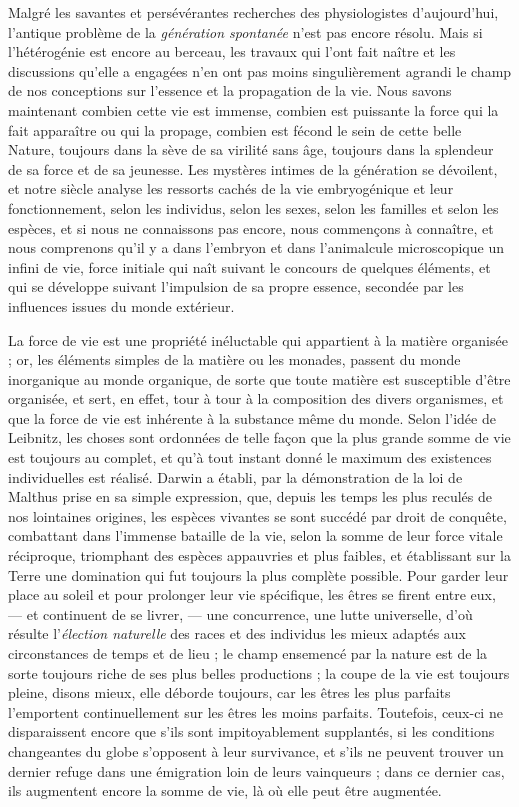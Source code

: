 \documentclass[a4paper, 11pt, oneside]{article}
\begin{document}
Malgré les savantes et persévérantes recherches des physiologistes d'aujourd'hui, l'antique problème de la \emph{génération spontanée} n'est pas encore résolu. Mais si l'hétérogénie est encore au berceau, les travaux qui l'ont fait naître et les discussions qu'elle a engagées n'en ont pas moins singulièrement agrandi le champ de nos conceptions sur l'essence et la propagation de la vie. Nous savons maintenant combien cette vie est immense, combien est puissante la force qui la fait apparaître ou qui la propage, combien est fécond le sein de cette belle Nature, toujours dans la sève de sa virilité sans âge, toujours dans la splendeur de sa force et de sa jeunesse. Les mystères intimes de la génération se dévoilent, et notre siècle analyse les ressorts cachés de la vie embryogénique et leur fonctionnement, selon les individus, selon les sexes, selon les familles et selon les espèces, et si nous ne connaissons pas encore, nous commençons à connaître, et nous comprenons qu'il y a dans l'embryon et dans l'animalcule microscopique un infini de vie, force initiale qui naît suivant le concours de quelques éléments, et qui se développe suivant l'impulsion de sa propre essence, secondée par les influences issues du monde extérieur.

La force de vie est une propriété inéluctable qui appartient à la matière organisée ; or, les éléments simples de la matière ou les monades, passent du monde inorganique au monde organique, de sorte que toute matière est susceptible d'être organisée, et sert, en effet, tour à tour à la composition des divers organismes, et que la force de vie est inhérente à la substance même du monde. Selon l'idée de Leibnitz, les choses sont ordonnées de telle façon que la plus grande somme de vie est toujours au complet, et qu'à tout instant donné le maximum des existences individuelles est réalisé. Darwin a établi, par la démonstration de la loi de Malthus prise en sa simple expression, que, depuis les temps les plus reculés de nos lointaines origines, les espèces vivantes se sont succédé par droit de conquête, combattant dans l'immense bataille de la vie, selon la somme de leur force vitale réciproque, triomphant des espèces appauvries et plus faibles, et établissant sur la Terre une domination qui fut toujours la plus complète possible. Pour garder leur place au soleil et pour prolonger leur vie spécifique, les êtres se firent entre eux, --- et continuent de se livrer, --- une concurrence, une lutte universelle, d'où résulte l'\emph{élection naturelle} des races et des individus les mieux adaptés aux circonstances de temps et de lieu ; le champ ensemencé par la nature est de la sorte toujours riche de ses plus belles productions ; la coupe de la vie est toujours pleine, disons mieux, elle déborde toujours, car les êtres les plus parfaits l'emportent continuellement sur les êtres les moins parfaits. Toutefois, ceux-ci ne disparaissent encore que s'ils sont impitoyablement supplantés, si les conditions changeantes du globe s'opposent à leur survivance, et s'ils ne peuvent trouver un dernier refuge dans une émigration loin de leurs vainqueurs ; dans ce dernier cas, ils augmentent encore la somme de vie, là où elle peut être augmentée.
\end{document}
